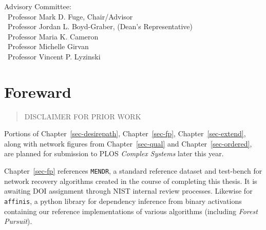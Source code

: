 \documentclass[%
	12pt,
		oneside,
		letterpaper
]{book}
\begin{document}
\vspace{7.5em}

\noindent Advisory Committee: \\
\hbox{\ }\hspace{.5in}Professor Mark D. Fuge, Chair/Advisor \\
\hbox{\ }\hspace{.5in}Professor Jordan L. Boyd-Graber, (Dean's
Representative) \\
\hbox{\ }\hspace{.5in}Professor Maria K. Cameron \\
\hbox{\ }\hspace{.5in}Professor Michelle Girvan \\
\hbox{\ }\hspace{.5in}Professor Vincent P. Lyzinski \\
 \doublespacing


% 

% 
{}




\chapter*{Foreward}\label{foreward}



\begin{quote}
DISCLAIMER FOR PRIOR WORK
\end{quote}

Portions of Chapter~\ref{sec-desirepath}, Chapter~\ref{sec-fp},
Chapter~\ref{sec-extend}, along with network figures from
Chapter~\ref{sec-qual} and Chapter~\ref{sec-ordered}, are planned for
submission to PLOS \emph{Complex Systems} later this year.

Chapter~\ref{sec-fp} references \texttt{MENDR}, a standard reference
dataset and test-bench for network recovery algorithms created in the
course of completing this thesis. It is awaiting DOI assignment through
NIST internal review processes. Likewise for \texttt{affinis}, a python
library for dependency inference from binary activations containing our
reference implementations of various algorithms (including \emph{Forest
Pursuit}).
\end{document}
